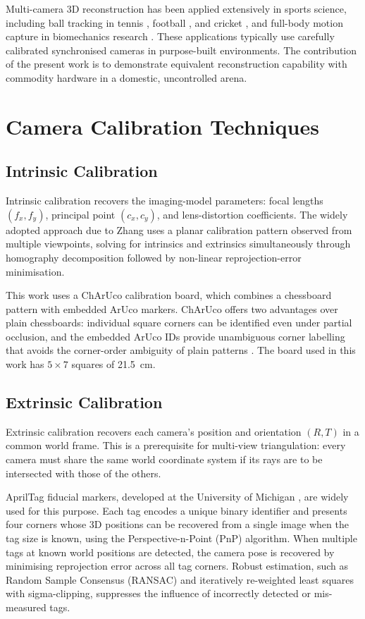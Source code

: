 Multi-camera 3D reconstruction has been applied extensively in sports science, including ball tracking in tennis \cite{ref5}, football \cite{ref6}, and cricket \cite{ref7}, and full-body motion capture in biomechanics research \cite{ref8}. These applications typically use carefully calibrated synchronised cameras in purpose-built environments. The contribution of the present work is to demonstrate equivalent reconstruction capability with commodity hardware in a domestic, uncontrolled arena.

\section{Camera Calibration Techniques}

\subsection{Intrinsic Calibration}

Intrinsic calibration recovers the imaging-model parameters: focal lengths $(f_x, f_y)$, principal point $(c_x, c_y)$, and lens-distortion coefficients. The widely adopted approach due to Zhang \cite{ref9} uses a planar calibration pattern observed from multiple viewpoints, solving for intrinsics and extrinsics simultaneously through homography decomposition followed by non-linear reprojection-error minimisation.

This work uses a ChArUco calibration board, which combines a chessboard pattern with embedded ArUco markers. ChArUco offers two advantages over plain chessboards: individual square corners can be identified even under partial occlusion, and the embedded ArUco IDs provide unambiguous corner labelling that avoids the corner-order ambiguity of plain patterns \cite{ref10, ref46_charuco_aruco}. The board used in this work has $5 \times 7$ squares of 21.5~cm.

\subsection{Extrinsic Calibration}

Extrinsic calibration recovers each camera's position and orientation $(R, T)$ in a common world frame. This is a prerequisite for multi-view triangulation: every camera must share the same world coordinate system if its rays are to be intersected with those of the others.

AprilTag fiducial markers, developed at the University of Michigan \cite{ref11}, are widely used for this purpose. Each tag encodes a unique binary identifier and presents four corners whose 3D positions can be recovered from a single image when the tag size is known, using the Perspective-n-Point (PnP) algorithm. When multiple tags at known world positions are detected, the camera pose is recovered by minimising reprojection error across all tag corners. Robust estimation, such as Random Sample Consensus (RANSAC) \cite{ref12} and iteratively re-weighted least squares with sigma-clipping, suppresses the influence of incorrectly detected or mis-measured tags.

